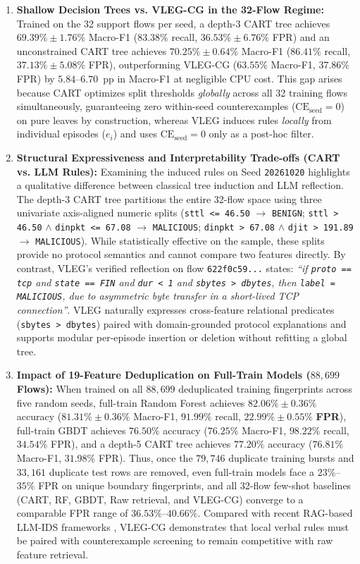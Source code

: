 \documentclass[10pt,a4paper,onecolumn]{article}
\theoremstyle{definition}
\theoremstyle{remark}
\begin{document}
\begin{enumerate}[leftmargin=1.8em]
    \item \textbf{Shallow Decision Trees vs. VLEG-CG in the 32-Flow Regime:} Trained on the 32 support flows per seed, a depth-3 CART tree achieves $69.39\% \pm 1.76\%$ Macro-F1 ($83.38\%$ recall, $36.53\% \pm 6.76\%$ FPR) and an unconstrained CART tree achieves $70.25\% \pm 0.64\%$ Macro-F1 ($86.41\%$ recall, $37.13\% \pm 5.08\%$ FPR), outperforming VLEG-CG ($63.55\%$ Macro-F1, $37.86\%$ FPR) by $5.84$--$6.70$~pp in Macro-F1 at negligible CPU cost. This gap arises because CART optimizes split thresholds \emph{globally} across all 32 training flows simultaneously, guaranteeing zero within-seed counterexamples ($\mathrm{CE}_{\mathrm{seed}}=0$) on pure leaves by construction, whereas VLEG induces rules \emph{locally} from individual episodes ($e_i$) and uses $\mathrm{CE}_{\mathrm{seed}}=0$ only as a post-hoc filter.
    \item \textbf{Structural Expressiveness and Interpretability Trade-offs (CART vs. LLM Rules):} Examining the induced rules on Seed \texttt{20261020} highlights a qualitative difference between classical tree induction and LLM reflection. The depth-3 CART tree partitions the entire 32-flow space using three univariate axis-aligned numeric splits (\texttt{sttl <= 46.50} $\to$ \texttt{BENIGN}; \texttt{sttl > 46.50} $\wedge$ \texttt{dinpkt <= 67.08} $\to$ \texttt{MALICIOUS}; \texttt{dinpkt > 67.08} $\wedge$ \texttt{djit > 191.89} $\to$ \texttt{MALICIOUS}). While statistically effective on the sample, these splits provide no protocol semantics and cannot compare two features directly. By contrast, VLEG's verified reflection on flow \texttt{622f0c59...} states: \emph{``if \texttt{proto == tcp} and \texttt{state == FIN} and \texttt{dur < 1} and \texttt{sbytes > dbytes}, then \texttt{label = MALICIOUS}, due to asymmetric byte transfer in a short-lived TCP connection''}. VLEG naturally expresses cross-feature relational predicates (\texttt{sbytes > dbytes}) paired with domain-grounded protocol explanations and supports modular per-episode insertion or deletion without refitting a global tree.
    \item \textbf{Impact of 19-Feature Deduplication on Full-Train Models ($88,699$ Flows):} When trained on all $88,699$ deduplicated training fingerprints across five random seeds, full-train Random Forest achieves $82.06\% \pm 0.36\%$ accuracy ($81.31\% \pm 0.36\%$ Macro-F1, $91.99\%$ recall, $\mathbf{22.99\% \pm 0.55\%}$ \textbf{FPR}), full-train GBDT achieves $76.50\%$ accuracy ($76.25\%$ Macro-F1, $98.22\%$ recall, $34.54\%$ FPR), and a depth-5 CART tree achieves $77.20\%$ accuracy ($76.81\%$ Macro-F1, $31.98\%$ FPR). Thus, once the $79,746$ duplicate training bursts and $33,161$ duplicate test rows are removed, even full-train models face a $23\%$--$35\%$ FPR on unique boundary fingerprints, and all 32-flow few-shot baselines (CART, RF, GBDT, Raw retrieval, and VLEG-CG) converge to a comparable FPR range of $36.53\%$--$40.66\%$. Compared with recent RAG-based LLM-IDS frameworks \cite{houssel2024explainable,islam2026maids}, VLEG-CG demonstrates that local verbal rules must be paired with counterexample screening to remain competitive with raw feature retrieval.

\end{enumerate}
\end{document}
